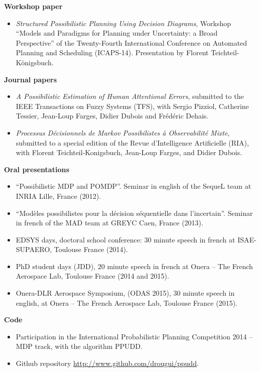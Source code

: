 \textbf{Workshop paper}
\begin{itemize}
\item \textit{Structured Possibilistic Planning Using Decision Diagrams}, 
Workshop ``Models and Paradigms for Planning under Uncertainty: a Broad Perspective'' 
of the Twenty-Fourth International Conference on Automated Planning and Scheduling (ICAPS-14).
Presentation by Florent Teichteil-K\"onigsbuch.
\end{itemize}

\textbf{Journal papers}
\begin{itemize}
\item \textit{A Possibilistic Estimation of Human Attentional Errors},
submitted to the IEEE Transactions on Fuzzy Systems (TFS),
with Sergio Pizziol, Catherine Tessier, Jean-Loup Farges, Didier Dubois and Fr\'ed\'eric Dehais.
\item \textit{Processus D\'ecisionnels de Markov Possibilistes \`a Observabilit\'e Mixte},
submitted to a special edition of the Revue d'Intelligence Artificielle (RIA),
with Florent Teichteil-Konigsbuch, Jean-Loup Farges, and Didier Dubois.
\end{itemize}

\textbf{Oral presentations}
\begin{itemize}
\item ``Possibilistic MDP and POMDP''. Seminar in english of the SequeL team at INRIA Lille, France (2012). 
\item ``Mod\`eles possibilistes pour la d\'ecision s\'equentielle dans l'incertain''. Seminar in french of the MAD team at GREYC Caen, France (2013).
\item EDSYS days, doctoral school conference: $30$ minute speech in french at ISAE-SUPAERO, Toulouse France (2014). 
\item PhD student days (JDD), $20$ minute speech in french at Onera -- The French Aerospace Lab, Toulouse France (2014 and 2015).
\item Onera-DLR Aerospace Symposium, (ODAS 2015), $30$ minute speech in english, at Onera -- The French Aerospace Lab, Toulouse France (2015).
\end{itemize}

\textbf{Code}
\begin{itemize}
\item Participation in the International Probabilistic Planning Competition 2014 -- MDP track, with the algorithm PPUDD.
\item Github repository \url{http://www.github.com/drougui/ppudd}.
\end{itemize}
